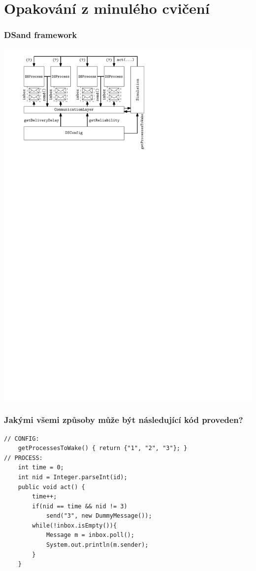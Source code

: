 \documentclass[usenames,dvipsnames,9pt]{beamer}
\begin{document}
\section{Opakování z minulého cvičení}

\begin{frame}
\frametitle{DSand framework}
\centering\includegraphics[width=0.8\linewidth]{10/figs/dsand.pdf}
\end{frame}

{
\begin{frame}[fragile]
\frametitle{Jakými všemi způsoby může být následující kód proveden?}

\begin{verbatim}
// CONFIG:
	getProcessesToWake() { return {"1", "2", "3"}; }
// PROCESS:
	int time = 0;
	int nid = Integer.parseInt(id);
	public void act() {
		time++;
		if(nid == time && nid != 3)
			send("3", new DummyMessage());
		while(!inbox.isEmpty()){
			Message m = inbox.poll();
			System.out.println(m.sender);
		}
	}
\end{verbatim}
\end{frame}
}
\end{document}

